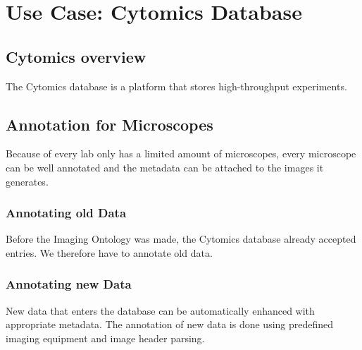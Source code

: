 
\chapter{Use Case: Cytomics Database} %

\label{Chapter5} %



\section{Cytomics overview}

The Cytomics database is a platform that
stores high-throughput experiments.


\section{Annotation for Microscopes}

Because of every lab only has a limited amount of
microscopes, every microscope can be well
annotated and the metadata can be
attached to the images it generates.


\subsection{Annotating old Data}

Before the Imaging Ontology was made, the
Cytomics database already accepted entries. We therefore have to annotate old data.


\subsection{Annotating new Data}

New data that enters the database can be automatically enhanced with
appropriate metadata. The
annotation of new data is done using
predefined imaging equipment and image header
parsing.

